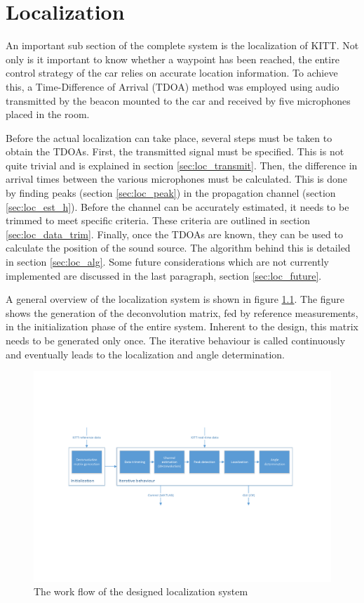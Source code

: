 \documentclass[11pt,titlepage]{report}
\begin{document}
\chapter{Localization}
An important sub section of the complete system is the localization of KITT. Not only is it important to know whether a waypoint has been reached, the entire control strategy of the car relies on accurate location information. To achieve this, a Time-Difference of Arrival (TDOA) method was employed using audio transmitted by the beacon mounted to the car and received by five microphones placed in the room.

Before the actual localization can take place, several steps must be taken to obtain the TDOAs. First, the transmitted signal must be specified. This is not quite trivial and is explained in section \ref{sec:loc_transmit}. Then, the difference in arrival times between the various microphones must be calculated. This is done by finding peaks (section \ref{sec:loc_peak}) in the propagation channel (section \ref{sec:loc_est_h}). Before the channel can be accurately estimated, it needs to be trimmed to meet specific criteria. These criteria are outlined in section \ref{sec:loc_data_trim}. Finally, once the TDOAs are known, they can be used to calculate the position of the sound source. The algorithm behind this is detailed in section \ref{sec:loc_alg}. Some future considerations which are not currently implemented are discussed in the last paragraph, section \ref{sec:loc_future}.

A general overview of the localization system is shown in figure \ref{fig:localization-overview}. The figure shows the generation of the deconvolution matrix, fed by reference measurements, in the initialization phase of the entire system. Inherent to the design, this matrix needs to be generated only once. The iterative behaviour is called continuously and eventually leads to the localization and angle determination.
\begin{figure}[H]
	\centering
	\includegraphics[width=\linewidth]{resource/localization-overview.pdf}
	\caption{The work flow of the designed localization system}
	\label{fig:localization-overview}
\end{figure}
\end{document}
